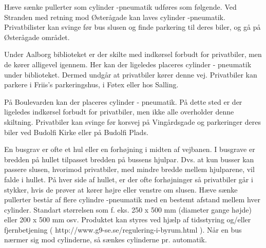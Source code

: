                                            
Hæve sænke pullerter som cylinder -pneumatik udføres som følgende. Ved Stranden med retning mod Østerågade kan laves cylinder -pneumatik. Privatbilister kan svinge før bus slusen og finde parkering til deres biler, og gå på Østerågade området. 
                                        
                                        
                                        
Under Aalborg biblioteket er der skilte med indkørsel forbudt for privatbiler, men de kører alligevel igennem. Her kan der ligeledes placeres cylinder - pneumatik under biblioteket. Dermed undgår at privatbiler kører denne vej. Privatbiler kan parkere i Friis’s parkeringshus, i Føtex eller hos Salling.                         
                                                   
                                                   
                                                   

På Boulevarden kan der placeres cylinder - pneumatik. På dette sted er der ligeledes indkørsel forbudt for privatbiler, men ikke alle overholder denne skiltning. Privatbiler kan svinge før korsvej på Vingårdsgade og parkeringer deres biler ved Budolfi Kirke eller på Budolfi Plads. 
                                                
                                                
                                      
En busgrav er ofte et hul eller en forhøjning i midten af vejbanen. I busgrave er bredden på hullet tilpasset bredden på bussens hjulpar. Dvs. at kun busser kan passere slusen, hvorimod privatbiler, med mindre bredde mellem hjulparene, vil falde i hullet. På hver side af hullet, er der ofte forhøjninger så privatbiler går i stykker, hvis de prøver at kører højre eller venstre om slusen.
Hæve sænke pullerter består af flere cylindre -pneumatik med en bestemt afstand mellem hver cylinder. Standart størrelsen som f. eks. 250 x 500 mm (diameter gange højde) eller 200 x 500 mm osv. Produktet kan styres ved hjælp af tidsstyring og/eller fjernbetjening ( http://www.g9-se.se/regulering-i-byrum.html ). Når en bus nærmer sig mod cylinderne, så sænkes cylinderne pr. automatik.

